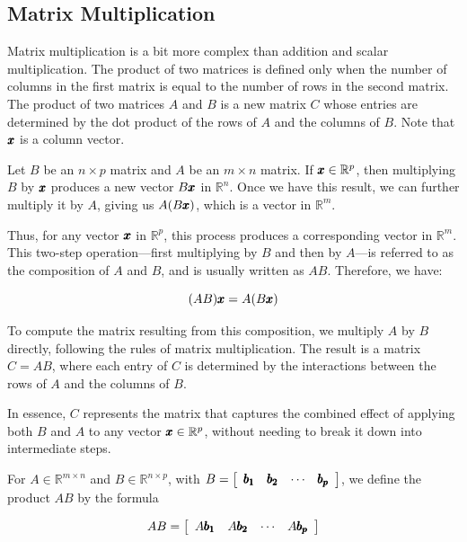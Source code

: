 \subsection*{Matrix Multiplication}
Matrix multiplication is a bit more complex than addition and scalar multiplication. The product of two matrices is defined only when the number of columns in the first matrix is equal to the number of rows in the second matrix. The product of two matrices $A$ and $B$ is a new matrix $C$ whose entries are determined by the dot product of the rows of $A$ and the columns of $B$. Note that $\pmb{x}$ is a column vector.

Let \(B\) be an \(n \times p\) matrix and \(A\) be an \(m \times n\) matrix. If \(\pmb{x} \in \mathbb{R}^p\), then multiplying \(B\) by \(\pmb{x}\) produces a new vector \(B\pmb{x}\) in \(\mathbb{R}^n\). Once we have this result, we can further multiply it by \(A\), giving us \(A(B\pmb{x})\), which is a vector in \(\mathbb{R}^m\).

Thus, for any vector \(\pmb{x}\) in \(\mathbb{R}^p\), this process produces a corresponding vector in \(\mathbb{R}^m\). This two-step operation—first multiplying by \(B\) and then by \(A\)—is referred to as the composition of \(A\) and \(B\), and is usually written as \(AB\). Therefore, we have:

\[
(AB)\pmb{x} = A(B\pmb{x})
\]

To compute the matrix resulting from this composition, we multiply \(A\) by \(B\) directly, following the rules of matrix multiplication. The result is a matrix \(C = AB\), where each entry of \(C\) is determined by the interactions between the rows of \(A\) and the columns of \(B\).

In essence, \(C\) represents the matrix that captures the combined effect of applying both \(B\) and \(A\) to any vector \(\pmb{x} \in \mathbb{R}^p\), without needing to break it down into intermediate steps.

\begin{definition}
    For $A \in \mathbb{R}^{m \times n}$ and $B \in \mathbb{R}^{n \times p}$, with $B=\left[\begin{array}{llll}\pmb{b_1} & \pmb{b_2} & \cdots & \pmb{b_p}\end{array}\right]$, we define the product $A B$ by the formula

\[
A B=\left[\begin{array}{llll}
A \pmb{b_1} & A \pmb{b_2} & \cdots & A \pmb{b_p}
\end{array}\right]
\]

\end{definition}

